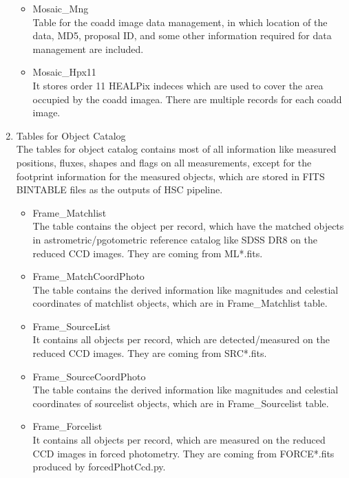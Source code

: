 \documentclass[12pt]{article}
\begin{document}
\begin{enumerate}
\begin{itemize}
\item Mosaic\_Mng\\
Table for the coadd image data management, in which location of the data, MD5, proposal ID, 
and some other information required for data management are included. 

\item Mosaic\_Hpx11\\
It stores order 11 HEALPix indeces which are used to cover the area occupied by the coadd imagea. 
There are multiple records for each coadd image.  

\end{itemize}

\item Tables for Object Catalog\\
The tables for object catalog contains most of all information like measured positions, fluxes, shapes and 
flags on all measurements, except for the footprint information for the measured objects, which are stored 
in FITS BINTABLE files as the outputs of HSC pipeline.   

\begin{itemize}

\item Frame\_Matchlist\\
The table contains the object per record, which have the matched objects in astrometric/pgotometric 
reference catalog like SDSS DR8 on the reduced CCD images. They are coming from ML*.fits. 

\item Frame\_MatchCoordPhoto\\
The table contains the derived information like magnitudes and celestial coordinates of matchlist 
objects, which are in Frame\_Matchlist table. 

\item Frame\_SourceList\\
It contains all objects per record, which are detected/measured on the reduced CCD images. They 
are coming from SRC*.fits. 

\item Frame\_SourceCoordPhoto\\
The table contains the derived information like magnitudes and celestial coordinates of sourcelist 
objects, which are in Frame\_Sourcelist table. 

\item Frame\_Forcelist\\
It contains all objects per record, which are measured on the reduced CCD images in forced photometry. 
They are coming from FORCE*.fits produced by forcedPhotCcd.py. 


\end{itemize}
\end{enumerate}
\end{document}
